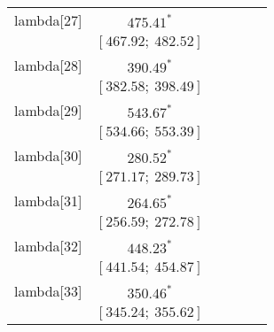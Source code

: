 \begin{table}
\begin{center}
\begin{tabular}{l c c c c c }
lambda[27]  & $475.41^{*}$                     &                           &                           &                         &                         \\
            & $[467.92;\ 482.52]$              &                           &                           &                         &                         \\
lambda[28]  & $390.49^{*}$                     &                           &                           &                         &                         \\
            & $[382.58;\ 398.49]$              &                           &                           &                         &                         \\
lambda[29]  & $543.67^{*}$                     &                           &                           &                         &                         \\
            & $[534.66;\ 553.39]$              &                           &                           &                         &                         \\
lambda[30]  & $280.52^{*}$                     &                           &                           &                         &                         \\
            & $[271.17;\ 289.73]$              &                           &                           &                         &                         \\
lambda[31]  & $264.65^{*}$                     &                           &                           &                         &                         \\
            & $[256.59;\ 272.78]$              &                           &                           &                         &                         \\
lambda[32]  & $448.23^{*}$                     &                           &                           &                         &                         \\
            & $[441.54;\ 454.87]$              &                           &                           &                         &                         \\
lambda[33]  & $350.46^{*}$                     &                           &                           &                         &                         \\
            & $[345.24;\ 355.62]$              &                           &                           &                         &                         \\

\end{tabular}
\end{center}
\end{table}
